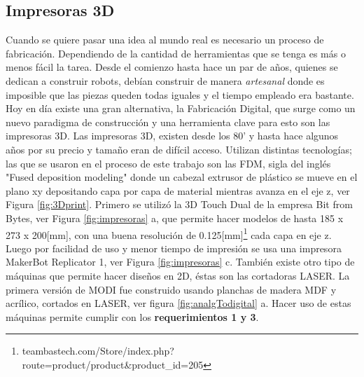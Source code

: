 \subsection{Impresoras 3D}
Cuando se quiere pasar una idea al mundo real es necesario un proceso de fabricación. Dependiendo de la cantidad de herramientas que se tenga es más o menos fácil la tarea. Desde el comienzo hasta hace un par de años, quienes se dedican a construir robots, debían construir de manera \textit{artesanal} donde es imposible que las piezas queden todas iguales y el tiempo empleado era bastante. Hoy en día existe una gran alternativa, la Fabricación Digital, que surge como un nuevo paradigma de construcción y una herramienta clave para esto son las impresoras 3D. Las impresoras 3D, existen desde los 80' y hasta hace algunos años por su precio y tamaño eran de difícil acceso. Utilizan distintas tecnologías; las que se usaron en el proceso de este trabajo son las FDM, sigla del inglés "Fused deposition modeling" donde un cabezal extrusor de plástico se mueve en el plano xy depositando capa por capa de material mientras avanza en el eje z, ver Figura \ref{fig:3Dprint}. Primero se utilizó la 3D Touch Dual de la empresa Bit from Bytes, ver Figura \ref{fig:impresoras} a, que permite hacer modelos de hasta 185 x 273 x 200[mm], con una buena resolución de 0.125[mm]\footnote{teambastech.com/Store/index.php?route=product/product\&product\_id=205} cada capa en eje z. Luego por facilidad de uso y menor tiempo de impresión se usa una impresora MakerBot Replicator 1, ver Figura \ref{fig:impresoras} c. También existe otro tipo de máquinas que permite hacer diseños en 2D, éstas son las cortadoras LASER. La primera versión de MODI fue construido usando planchas de madera MDF y acrílico, cortados en LASER, ver figura \ref{fig:analgTodigital} a. Hacer uso de estas máquinas permite cumplir con los \textbf{requerimientos 1 y 3}.

